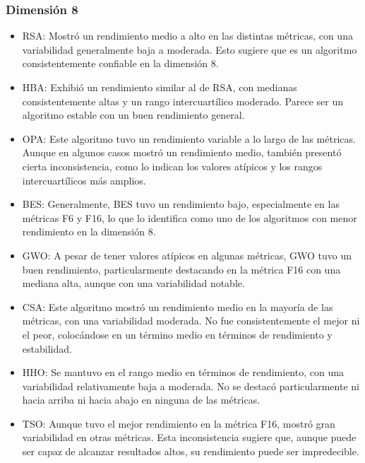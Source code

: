 \documentclass[conference]{IEEEtran}
\begin{document}
\subsubsection{Dimensión 8}
\begin{itemize}
\item RSA: Mostró un rendimiento medio a alto en las distintas métricas, con una variabilidad generalmente baja a moderada. Esto sugiere que es un algoritmo consistentemente confiable en la dimensión 8.

\item HBA: Exhibió un rendimiento similar al de RSA, con medianas consistentemente altas y un rango intercuartílico moderado. Parece ser un algoritmo estable con un buen rendimiento general.

\item OPA: Este algoritmo tuvo un rendimiento variable a lo largo de las métricas. Aunque en algunos casos mostró un rendimiento medio, también presentó cierta inconsistencia, como lo indican los valores atípicos y los rangos intercuartílicos más amplios.

\item BES: Generalmente, BES tuvo un rendimiento bajo, especialmente en las métricas F6 y F16, lo que lo identifica como uno de los algoritmos con menor rendimiento en la dimensión 8.

\item GWO: A pesar de tener valores atípicos en algunas métricas, GWO tuvo un buen rendimiento, particularmente destacando en la métrica F16 con una mediana alta, aunque con una variabilidad notable.

\item CSA: Este algoritmo mostró un rendimiento medio en la mayoría de las métricas, con una variabilidad moderada. No fue consistentemente el mejor ni el peor, colocándose en un término medio en términos de rendimiento y estabilidad.

\item HHO: Se mantuvo en el rango medio en términos de rendimiento, con una variabilidad relativamente baja a moderada. No se destacó particularmente ni hacia arriba ni hacia abajo en ninguna de las métricas.

\item TSO: Aunque tuvo el mejor rendimiento en la métrica F16, mostró gran variabilidad en otras métricas. Esta inconsistencia sugiere que, aunque puede ser capaz de alcanzar resultados altos, su rendimiento puede ser impredecible.
\end{itemize}
\end{document}
